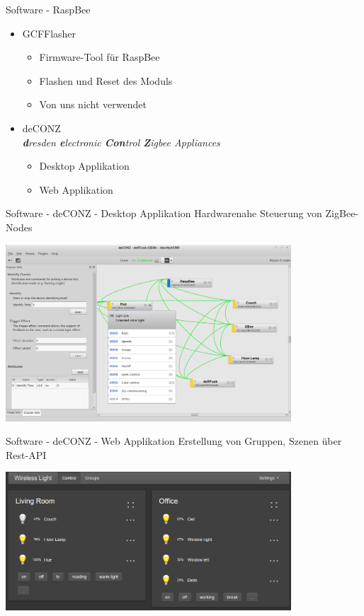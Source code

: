 \begin{frame}{Software - RaspBee}
  \Large
  \begin{itemize}
    \item GCFFlasher
    \begin{itemize}
      \Large
      \item Firmware-Tool für RaspBee
      \item Flashen und Reset des Moduls
      \item Von uns nicht verwendet
      \newline
    \end{itemize}
	\item deCONZ\\
      \normalsize{\textit{\textbf dresden \textbf electronic \textbf{Con}trol
        \textbf Zigbee Appliances}}
    \begin{itemize}
      \Large
      \item Desktop Applikation
      \item Web Applikation
    \end{itemize}
  \end{itemize}
\end{frame}

\begin{frame}{Software - deCONZ - Desktop Applikation}
  \Large
  Hardwarenahe Steuerung von ZigBee-Nodes
  \begin{center}
    \includegraphics[width=0.8\textwidth]{images/deconz_app}
  \end{center}
\end{frame}

\begin{frame}{Software - deCONZ - Web Applikation}
  \Large
  Erstellung von Gruppen, Szenen über Rest-API
  \begin{center}
    \includegraphics[width=0.8\textwidth]{images/deconz_web}
  \end{center}
\end{frame}